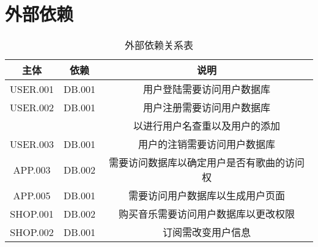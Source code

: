 \section{外部依赖}
\begin{table}[h]
    \caption {外部依赖关系表}
    \begin{tabular}{|c|c|c|}
        \hline
        主体 & 依赖 & 说明\\
        \hline
        USER.001 & DB.001 & 用户登陆需要访问用户数据库\\
        \hline
        USER.002 & DB.001 & 用户注册需要访问用户数据库\\
        & & 以进行用户名查重以及用户的添加\\
        \hline
        USER.003 & DB.001 & 用户的注销需要访问用户数据库\\
        \hline
        APP.003 & DB.002 & 需要访问数据库以确定用户是否有歌曲的访问权\\
        \hline
        APP.005 & DB.001 & 需要访问用户数据库以生成用户页面\\
        \hline
        SHOP.001 & DB.002 & 购买音乐需要访问用户数据库以更改权限\\
        \hline
        SHOP.002 & DB.001 & 订阅需改变用户信息\\
        \hline
    \end{tabular}
\end{table}
